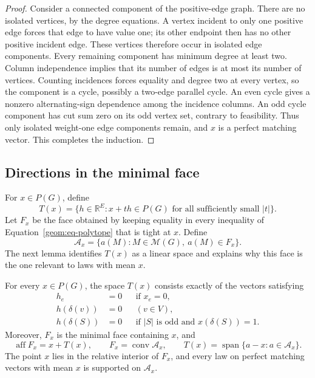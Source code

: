 \begin{proof}
Consider a connected component of the positive-edge graph. There are
no isolated vertices, by the degree equations. A vertex incident to
only one positive edge forces that edge to have value one; its other
endpoint then has no other positive incident edge. These vertices
therefore occur in isolated edge components. Every remaining
component has minimum degree at least two. Column independence
implies that its number of edges is at most its number of vertices.
Counting incidences forces equality and degree two at every vertex,
so the component is a cycle, possibly a two-edge parallel cycle. An
even cycle gives a nonzero alternating-sign dependence among the
incidence columns. An odd cycle component has cut sum zero on its
odd vertex set, contrary to feasibility. Thus only isolated
weight-one edge components remain, and \(x\) is a perfect matching
vector. This completes the induction.
\end{proof}

\subsection{Directions in the minimal face}

For \(x\in P(G)\), define
\[
 T(x)=\{h\in\mathbb R^E:
     x+th\in P(G)\text{ for all sufficiently small }|t|\}.
\]
Let \(F_x\) be the face obtained by keeping equality in every
inequality of Equation~\eqref{geom:eq-polytope} that is tight at
\(x\). Define
\[
 \mathcal A_x=\{a(M):M\in\mathcal M(G),\ a(M)\in F_x\}.
\]
The next lemma identifies \(T(x)\) as a linear space and explains
why this face is the one relevant to laws with mean \(x\).

\begin{lemma}
\label{geom:lem-face}
For every \(x\in P(G)\), the space \(T(x)\) consists exactly of
the vectors satisfying
\begin{equation}
\label{geom:eq-directions}
\begin{aligned}
 h_e&=0 &&\text{if }x_e=0,\\
 h(\delta(v))&=0 &&(v\in V),\\
 h(\delta(S))&=0
   &&\text{if }|S|\text{ is odd and }x(\delta(S))=1.
\end{aligned}
\end{equation}
Moreover, \(F_x\) is the minimal face containing \(x\), and
\begin{equation}
\label{geom:eq-face-span}
 \operatorname{aff}F_x=x+T(x),\qquad
 F_x=\operatorname{conv}\mathcal A_x,\qquad
 T(x)=\operatorname{span}\{a-x:a\in\mathcal A_x\}.
\end{equation}
The point \(x\) lies in the relative interior of \(F_x\), and every
law on perfect matching vectors with mean \(x\) is supported on
\(\mathcal A_x\).
\end{lemma}

